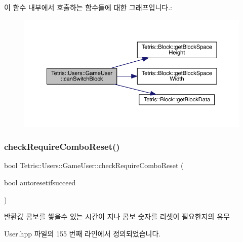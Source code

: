 이 함수 내부에서 호출하는 함수들에 대한 그래프입니다.\+:
\nopagebreak
\begin{figure}[H]
\begin{center}
\leavevmode
\includegraphics[width=350pt]{class_tetris_1_1_users_1_1_game_user_a1962ed051506010440645f7f3b50760d_cgraph}
\end{center}
\end{figure}
\mbox{\label{class_tetris_1_1_users_1_1_game_user_a82ea0dfdb99643a1b577a22f5e504346}} 
\subsubsection{\texorpdfstring{check\+Require\+Combo\+Reset()}{checkRequireComboReset()}}
{\footnotesize\ttfamily bool Tetris\+::\+Users\+::\+Game\+User\+::check\+Require\+Combo\+Reset (\begin{DoxyParamCaption}\item[{bool}]{autoresetifsucceed }\end{DoxyParamCaption})\hspace{0.3cm}{\ttfamily [inline]}}

\begin{DoxyReturn}{반환값}
콤보를 쌓을수 있는 시간이 지나 콤보 숫자를 리셋이 필요한지의 유무 
\end{DoxyReturn}


User.\+hpp 파일의 155 번째 라인에서 정의되었습니다.

\mbox{\label{class_tetris_1_1_users_1_1_game_user_a5efbd1ed9fa84a4041c218fb32463c36}} 

